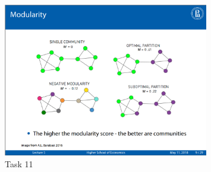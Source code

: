 \documentclass{cernatsnote}
\begin{document}

\begin{figure}[h!]
\centering
\includegraphics[width=0.8\textwidth]{images/task11.png}
\caption{\label{fig:task9} Task 11}
\end{figure}





\end{document}
